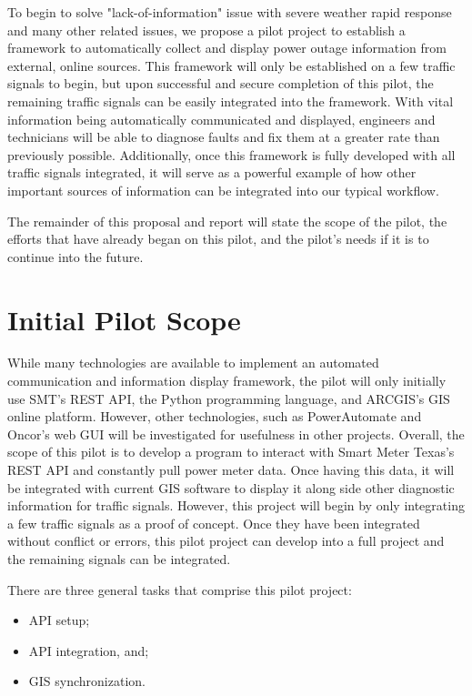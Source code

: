 \documentclass[]{amsldoc}
\begin{document}
To begin to solve "lack-of-information" issue with severe weather rapid response and many other related issues, we propose a pilot project to establish a framework to automatically collect and display power outage information from external, online sources. This framework will only be established on a few traffic signals to begin, but upon successful and secure completion of this pilot, the remaining traffic signals can be easily integrated into the framework. With vital information being automatically communicated and displayed, engineers and technicians will be able to diagnose faults and fix them at a greater rate than previously possible. Additionally, once this framework is fully developed with all traffic signals integrated, it will serve as a powerful example of how other important sources of information can be integrated into our typical workflow.

The remainder of this proposal and report will state the scope of the pilot, the efforts that have already began on this pilot, and the pilot's needs if it is to continue into the future.

\section{Initial Pilot Scope}
While many technologies are available to implement an automated communication and information display framework, the pilot will only initially use SMT's REST API, the Python programming language, and ARCGIS's GIS online platform. However, other technologies, such as PowerAutomate and Oncor's web GUI will be investigated for usefulness in other projects. Overall, the scope of this pilot is to develop a program to interact with Smart Meter Texas's REST API and constantly pull power meter data. Once having this data, it will be integrated with current GIS software to display it along side other diagnostic information for traffic signals. However, this project will begin by only integrating a few traffic signals as a proof of concept. Once they have been integrated without conflict or errors, this pilot project can develop into a full project and the remaining signals can be integrated.

There are three general tasks that comprise this pilot project: 
\begin{itemize}
    \item API setup;
    \item API integration, and;
    \item GIS synchronization.
\end{itemize}
\end{document}
